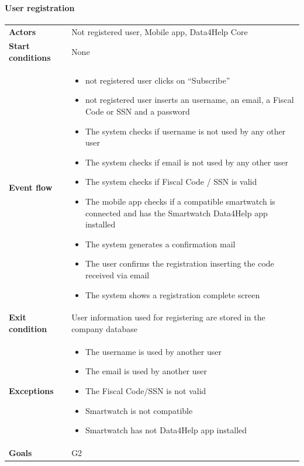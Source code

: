 \paragraph{User registration}
\begin{center}
\begin{table}[H]
\centering
\begin{tabular}{l|p{}}
\textbf{Actors} & Not registered user, Mobile app, Data4Help Core \\
\textbf{Start conditions} & None \\
\textbf{Event flow}  & 


 \begin{minipage}[t] {0.7\textwidth} 
 \begin{itemize}
      \item  not registered user clicks on “Subscribe”
      \item not registered user inserts an username, an email, a Fiscal Code or SSN and a password
      \item The system checks if username is not used by any other user
      \item The system checks if email is not used by any other user
      \item The system checks if Fiscal Code / SSN is valid
      \item The mobile app checks if a compatible smartwatch is connected and has the Smartwatch Data4Help app installed
      \item The system generates a confirmation mail
      \item The user confirms the registration inserting the code received via email 
      \item The system shows a registration complete screen
  \end{itemize}
\end{minipage}
 \\
\textbf{Exit condition} & User information used for registering are stored in the company database \\
\textbf{Exceptions} & 
\begin{minipage}[t] {0.7\textwidth} 
 \begin{itemize}
 
 \item The username is used by another user
\item The email is used by another user
\item The Fiscal Code/SSN is not valid
\item Smartwatch is not compatible
\item Smartwatch has not Data4Help app installed
\end{itemize}
 \end{minipage}\\
\textbf{Goals} & G2 
\end{tabular}

\end{table}
\end{center}


